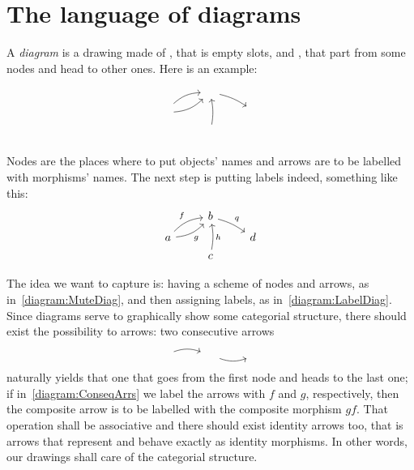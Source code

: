 
\section{The language of diagrams}

A {\em diagram} is a drawing made of , that is empty slots, and , that part from some nodes and head to other ones. Here is an example:
\begin{equation}\begin{tikzcd}[row sep=tiny]
  & \phantom\square \ar[dr, bend left=10] \\
\phantom\square \ar[ur, bend left=20] \ar[ur, bend right=20, swap] & & \phantom\square  \\
  & \phantom\square \ar[uu, bend right=10, swap] 
\end{tikzcd}\label{diagram:MuteDiag}\end{equation}

Nodes are the places where to put objects' names and arrows are to be labelled with morphisms' names. The next step is putting labels indeed, something like this:
\begin{equation}\begin{tikzcd}[row sep=tiny]
  & b \ar["q", dr, bend left=10] \\
a \arrow["f", ur, bend left=20] \arrow["g", ur, bend right=20, swap] & & d  \\
  & c \arrow["h", uu, bend right=10, swap] 
\end{tikzcd}\label{diagram:LabelDiag}\end{equation}

The idea we want to capture is: having a scheme of nodes and arrows, as in~\eqref{diagram:MuteDiag}, and then assigning labels, as in~\eqref{diagram:LabelDiag}. Since diagrams serve to graphically show some categorial structure, there should exist the possibility to  arrows: two consecutive arrows
\begin{equation}\begin{tikzcd}
\phantom\square \ar[r, bend left=20] & \phantom\square \ar[r, swap, bend right=20] & \phantom\square
\end{tikzcd}\label{diagram:ConseqArrs}\end{equation}
naturally yields that one that goes from the first node and heads to the last one; if in~\eqref{diagram:ConseqArrs} we label the arrows with \(f\) and \(g\), respectively, then the composite arrow is to be labelled with the composite morphism \(gf\). That operation shall be associative and there should exist identity arrows too, that is arrows that represent and behave exactly as identity morphisms. In other words, our drawings shall care of the categorial structure.

